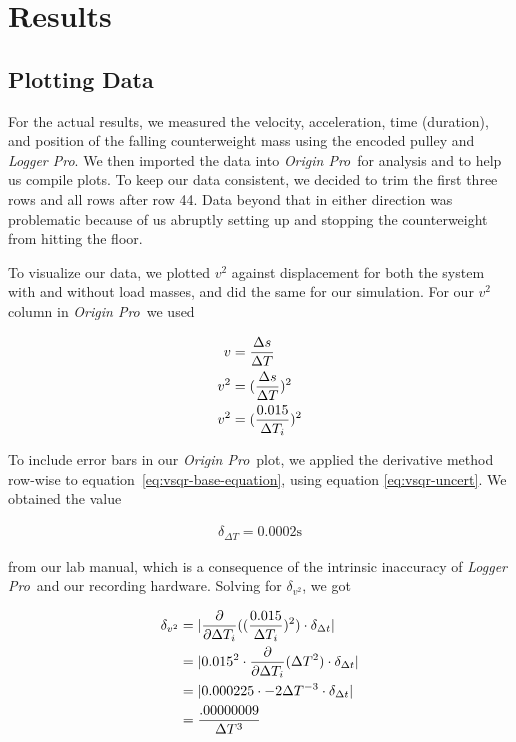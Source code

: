 \documentclass[coverpage]{article}
\newcommand{\softwareText}[1]{\textit{#1}\texttrademark}
\newcommand{\loggerpro}{\softwareText{Logger Pro}}
\newcommand{\origin}{\softwareText{Origin Pro}}
\begin{document}
	\section{Results}
	
	\subsection{Plotting Data}
	
	For the actual results, we measured the velocity,  acceleration, time (duration), and position of the falling counterweight mass using the encoded pulley and \loggerpro. We then imported the data into \origin~for analysis and to help us compile plots. To keep our data consistent, we decided to trim the first three rows and all rows after row 44. Data beyond that in either direction was problematic because of us abruptly setting up and stopping the counterweight from hitting the floor.
	
	To visualize our data, we plotted $v^2$ against displacement for both the system with and without load masses, and did the same for our simulation. For our $v^2$ column in \origin~we used
	
	\begin{align}
		v&=\frac{\Delta{s}}{\Delta{T}} \notag \\
		v^2&=(\frac{\Delta{s}}{\Delta{T}})^2 \notag \\
		v^2&=(\frac{0.015}{\Delta{T}_i})^2 \label{eq:vsqr-base-equation}
	\end{align}

	To include error bars in our \origin~plot, we applied the derivative method row-wise to equation~\ref{eq:vsqr-base-equation}, using equation \ref{eq:vsqr-uncert}. We obtained the value
	
	\begin{align}
		\delta_{\Delta{T}} = 0.0002 \text{s}
	\end{align}

	from our lab manual, which is a consequence of the intrinsic inaccuracy of \loggerpro~and our recording hardware. Solving for $\delta_{v^2}$, we got
	 
	\begin{align}
		\delta_{v^2}&=|\frac{\partial}{\partial \Delta{T_i}} ((\frac{0.015}{\Delta{T}_i})^2) \cdot \delta_{\Delta{t}}| \notag \\
		&=|0.015^2 \cdot \frac{\partial}{\partial \Delta{T_i}} (\Delta{T}^2) \cdot \delta_{\Delta{t}}| \notag \\
		&=|0.000225 \cdot -2 \Delta{T}^{-3} \cdot \delta_{\Delta{t}}| \notag \\
		&=\frac{.00000009}{\Delta{T}^3}
		\label{eq:vsqr-uncert}
	\end{align}
	
\end{document}
